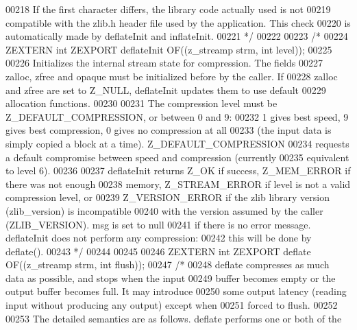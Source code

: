 \begin{DoxyCode}
00218 \textcolor{comment}{   If the first character differs, the library code actually used is not}
00219 \textcolor{comment}{   compatible with the zlib.h header file used by the application.  This check}
00220 \textcolor{comment}{   is automatically made by deflateInit and inflateInit.}
00221 \textcolor{comment}{ */}
00222 
00223 \textcolor{comment}{/*}
00224 \textcolor{comment}{ZEXTERN int ZEXPORT deflateInit OF((z\_streamp strm, int level));}
00225 \textcolor{comment}{}
00226 \textcolor{comment}{     Initializes the internal stream state for compression.  The fields}
00227 \textcolor{comment}{   zalloc, zfree and opaque must be initialized before by the caller.  If}
00228 \textcolor{comment}{   zalloc and zfree are set to Z\_NULL, deflateInit updates them to use default}
00229 \textcolor{comment}{   allocation functions.}
00230 \textcolor{comment}{}
00231 \textcolor{comment}{     The compression level must be Z\_DEFAULT\_COMPRESSION, or between 0 and 9:}
00232 \textcolor{comment}{   1 gives best speed, 9 gives best compression, 0 gives no compression at all}
00233 \textcolor{comment}{   (the input data is simply copied a block at a time).  Z\_DEFAULT\_COMPRESSION}
00234 \textcolor{comment}{   requests a default compromise between speed and compression (currently}
00235 \textcolor{comment}{   equivalent to level 6).}
00236 \textcolor{comment}{}
00237 \textcolor{comment}{     deflateInit returns Z\_OK if success, Z\_MEM\_ERROR if there was not enough}
00238 \textcolor{comment}{   memory, Z\_STREAM\_ERROR if level is not a valid compression level, or}
00239 \textcolor{comment}{   Z\_VERSION\_ERROR if the zlib library version (zlib\_version) is incompatible}
00240 \textcolor{comment}{   with the version assumed by the caller (ZLIB\_VERSION).  msg is set to null}
00241 \textcolor{comment}{   if there is no error message.  deflateInit does not perform any compression:}
00242 \textcolor{comment}{   this will be done by deflate().}
00243 \textcolor{comment}{*/}
00244 
00245 
00246 ZEXTERN \textcolor{keywordtype}{int} ZEXPORT deflate OF((z\_streamp strm, \textcolor{keywordtype}{int} flush));
00247 \textcolor{comment}{/*}
00248 \textcolor{comment}{    deflate compresses as much data as possible, and stops when the input}
00249 \textcolor{comment}{  buffer becomes empty or the output buffer becomes full.  It may introduce}
00250 \textcolor{comment}{  some output latency (reading input without producing any output) except when}
00251 \textcolor{comment}{  forced to flush.}
00252 \textcolor{comment}{}
00253 \textcolor{comment}{    The detailed semantics are as follows.  deflate performs one or both of the}

\end{DoxyCode}
